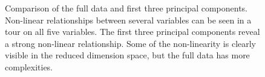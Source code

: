 \documentclass[
  letterpaper,
]{krantz}
\begin{document}
\begin{figure}

\begin{minipage}{0.50\linewidth}



\end{minipage}%
%
\begin{minipage}{0.50\linewidth}



\end{minipage}%

\caption{\label{fig-plane-nonlin-pdf}Comparison of the full data and
first three principal components. Non-linear relationships between
several variables can be seen in a tour on all five variables. The first
three principal components reveal a strong non-linear relationship. Some
of the non-linearity is clearly visible in the reduced dimension space,
but the full data has more complexities. }

\end{figure}%
\end{document}
